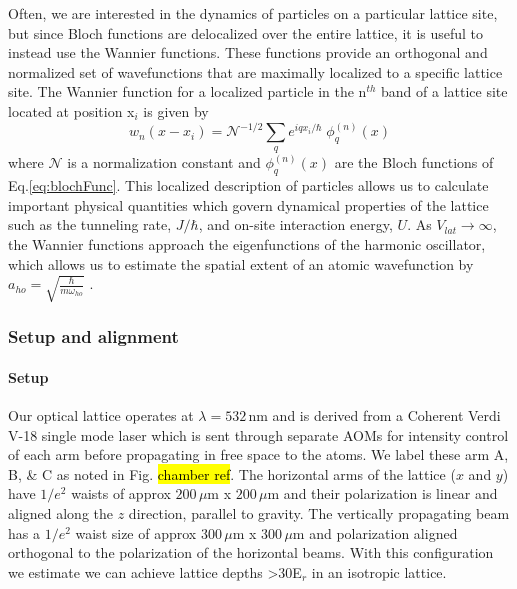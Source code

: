 Often, we are interested in the dynamics of particles on a particular lattice site, but since Bloch functions are delocalized over the entire lattice, it is useful to instead use the Wannier functions. 
These functions provide an orthogonal and normalized set of wavefunctions that are maximally localized to a specific lattice site. 
The Wannier function for a localized particle in the n$^{th}$ band of a lattice site located at position x$_i$ is given by \cite{Jaksch2005}
	\begin{equation} \label{eq:wannier}
		 w_{n}(x - x_i) = \mathcal{N}^{-1/2} \sum_q e^{iqx_i/ \hbar} \; \phi_q^{(n)}(x)
	\end{equation}
where $\mathcal{N}$ is a normalization constant and $\phi_q^{(n)}(x)$ are the Bloch functions of Eq.\;\ref{eq:blochFunc}.
This localized description of particles allows us to calculate important physical quantities which govern dynamical properties of the lattice such as the tunneling rate, $J/ \hbar$, and on-site interaction energy, $U$. 
As $V_{lat}\!\rightarrow\!\infty$, the Wannier functions approach the eigenfunctions of the harmonic oscillator, which allows us to estimate the spatial extent of an atomic wavefunction by $a_{ho} = \sqrt{\frac{\hbar}{m \omega_{ho}}}$ \cite{Jaksch2005}.

\subsubsection{Setup and alignment} \label{sssec:532_align}

\paragraph{Setup}\label{ssec:lattice_setup}

Our optical lattice operates at $\lambda=532\,$nm and is derived from a Coherent Verdi V-18 single mode laser which is sent through separate AOMs for intensity control of each arm before propagating in free space to the atoms. 
We label these arm A, B, \& C as noted in Fig. \hl{chamber ref}.
The horizontal arms of the lattice ($x$ and $y$) have $1/e^2$ waists of approx $200\,\mu$m x $200\,\mu$m and their polarization is linear and aligned along the $z$ direction, parallel to gravity. 
The vertically propagating beam has a $1/e^2$ waist size of approx $300\,\mu$m x $300\,\mu$m and polarization aligned orthogonal to the polarization of the horizontal beams. 
With this configuration we estimate we can achieve lattice depths >$30$E$_r$ in an isotropic lattice. 


